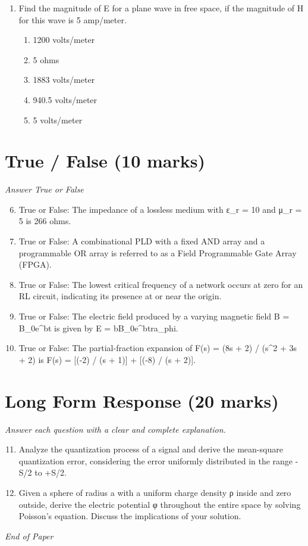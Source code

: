 \documentclass[12pt]{article}
\begin{document}
\begin{enumerate}[label=\arabic*.]
\begin{enumerate}[label=(\alph*)]
    \item 1/6
    \item 2/6
    \item 1/8
\end{enumerate}
\item Find the magnitude of E for a plane wave in free space, if the magnitude of H for this
wave is 5 amp/meter.
\begin{enumerate}[label=(\alph*)]
    \item 1200 volts/meter
    \item 5 ohms
    \item 1883 volts/meter
    \item 940.5 volts/meter
    \item 5 volts/meter
\end{enumerate}
\end{enumerate}

\section*{True / False (10 marks)}
\textit{Answer True or False}
\begin{enumerate}[label=\arabic*.]
\setcounter{enumi}{5}
\item True or False: The impedance of a lossless medium with ε\_r = 10 and μ\_r = 5 is 266 ohms.
\item True or False: A combinational PLD with a fixed AND array and a programmable OR array is referred to as a Field Programmable Gate Array (FPGA).
\item True or False: The lowest critical frequency of a network occurs at zero for an RL circuit, indicating its presence at or near the origin.
\item True or False: The electric field produced by a varying magnetic field B = B\_0e\^{}bt is given by E = bB\_0e\^{}btra\_phi.
\item True or False: The partial-fraction expansion of F(s) = (8s + 2) / (s\^{}2 + 3s + 2) is F(s) = [(-2) / (s + 1)] + [(-8) / (s + 2)].
\end{enumerate}

\section*{Long Form Response (20 marks)}
\textit{Answer each question with a clear and complete explanation.}
\begin{enumerate}[label=\arabic*.]
\setcounter{enumi}{10}
\item Analyze the quantization process of a signal and derive the mean-square quantization
error, considering the error uniformly distributed in the range -S/2 to +S/2.
\item Given a sphere of radius a with a uniform charge density ρ inside and zero outside, derive
the electric potential φ throughout the entire space by solving Poisson's equation.
Discuss the implications of your solution.
\end{enumerate}

\vfill
\noindent\textit{End of Paper}
\end{document}
